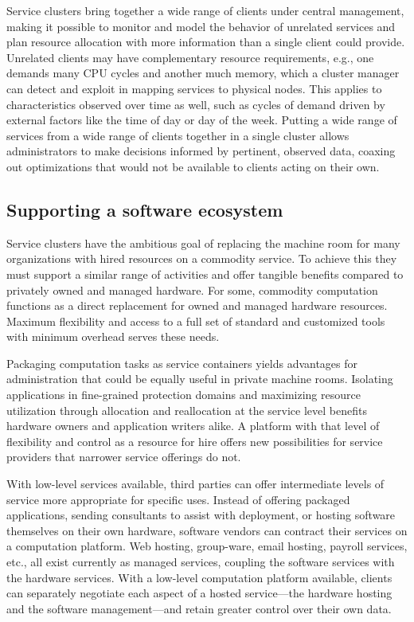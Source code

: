 Service clusters bring together a wide range of clients under central management, making it possible to monitor and model the behavior of unrelated services and plan resource allocation with more information than a single client could provide. Unrelated clients may have complementary resource requirements, e.g., one demands many CPU cycles and another much memory, which a cluster manager can detect and exploit in mapping services to physical nodes. This applies to characteristics observed over time as well, such as cycles of demand driven by external factors like the time of day or day of the week. Putting a wide range of services from a wide range of clients together in a single cluster allows administrators to make decisions informed by pertinent, observed data, coaxing out optimizations that would not be available to clients acting on their own.

\subsection{Supporting a software ecosystem}

Service clusters have the ambitious goal of replacing the machine room for many organizations with hired resources on a commodity service. To achieve this they must support a similar range of activities and offer tangible benefits compared to privately owned and managed hardware. For some, commodity computation functions as a direct replacement for owned and managed hardware resources. Maximum flexibility and access to a full set of standard and customized tools with minimum overhead serves these needs.

Packaging computation tasks as service containers yields advantages for administration that could be equally useful in private machine rooms. Isolating applications in fine-grained protection domains and maximizing resource utilization through allocation and reallocation at the service level benefits hardware owners and application writers alike. A platform with that level of flexibility and control as a resource for hire offers new possibilities for service providers that narrower service offerings do not.

With low-level services available, third parties can offer intermediate levels of service more appropriate for specific uses. Instead of offering packaged applications, sending consultants to assist with deployment, or hosting software themselves on their own hardware, software vendors can contract their services on a computation platform. Web hosting, group-ware, email hosting, payroll services, etc., all exist currently as managed services, coupling the software services with the hardware services. With a low-level computation platform available, clients can separately negotiate each aspect of a hosted service---the hardware hosting and the software management---and retain greater control over their own data.

